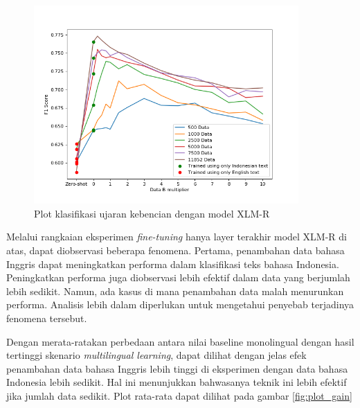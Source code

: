\begin{enumerate}
            \begin{figure}[ht]
                \centering
                \includegraphics[width=0.9\textwidth]{resources/plot-head-toxic-xlmr.png}
                \caption{Plot klasifikasi ujaran kebencian dengan model XLM-R}
                \label{fig:plot_head_toxic_xlmr}
            \end{figure}

        \end{enumerate}
        
        Melalui rangkaian eksperimen \textit{fine-tuning} hanya layer terakhir model XLM-R di atas, dapat diobservasi beberapa fenomena. Pertama, penambahan data bahasa Inggris dapat meningkatkan performa dalam klasifikasi teks bahasa Indonesia. Peningkatkan performa juga diobservasi lebih efektif dalam data yang berjumlah lebih sedikit. Namun, ada kasus di mana penambahan data malah menurunkan performa. Analisis lebih dalam diperlukan untuk mengetahui penyebab terjadinya fenomena tersebut.

        Dengan merata-ratakan perbedaan antara nilai baseline monolingual dengan hasil tertinggi skenario \textit{multilingual learning}, dapat dilihat dengan jelas efek penambahan data bahasa Inggris lebih tinggi di eksperimen dengan data bahasa Indonesia lebih sedikit. Hal ini menunjukkan bahwasanya teknik ini lebih efektif jika jumlah data sedikit. Plot rata-rata dapat dilihat pada gambar \ref{fig:plot_gain}

